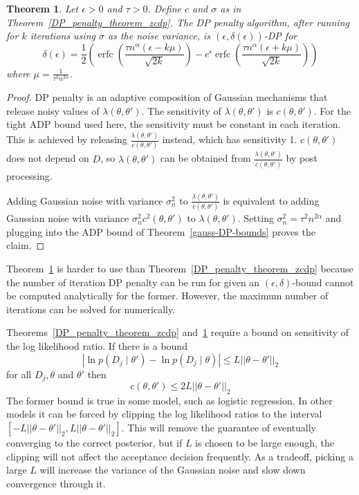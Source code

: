 \documentclass[english,twoside,openright]{HYgraduMLDS}
\newtheorem{theorem}{Theorem}
\DeclareMathOperator{\erfc}{erfc}
\begin{document}
\begin{theorem}\label{DP_penalty_theorem_adp}
    Let \(\epsilon > 0\) and \(\tau > 0\).
    Define \(c\) and \(\sigma\) as in Theorem~\ref{DP_penalty_theorem_zcdp}.
    The DP penalty algorithm, after running for \(k\) iterations using \(\sigma\)
    as the noise variance, 
    is \((\epsilon, \delta(\epsilon))\)-DP for
    \[
        \delta(\epsilon) 
        = \frac{1}{2}\left(
            \erfc\left(\frac{\tau n^\alpha(\epsilon - k\mu)}{\sqrt{2k}}\right)
            - e^\epsilon \erfc\left(\frac{\tau n^\alpha(\epsilon + k\mu)}{\sqrt{2k}}\right)
        \right)
    \]
    where \(\mu = \frac{1}{\tau^2 n^{2\alpha}}\).
\end{theorem}
\begin{proof}
    DP penalty is an adaptive composition of Gaussian mechanisms that release 
    noisy values of \(\lambda(\theta, \theta')\). The sensitivity of 
    \(\lambda(\theta, \theta')\) is 
    \(c(\theta, \theta')\). For the tight ADP bound used here, the sensitivity must be 
    constant in each iteration. This is achieved by releasing 
    \(\frac{\lambda(\theta, \theta')}{c(\theta, \theta')}\) instead, which 
    has sensitivity 1. \(c(\theta, \theta')\) does not depend on \(D\), 
    so \(\lambda(\theta, \theta')\) can be obtained from 
    \(\frac{\lambda(\theta, \theta')}{c(\theta, \theta')}\) by post processing.

    Adding Gaussian noise with variance \(\sigma_n^2\) to 
    \(\frac{\lambda(\theta, \theta')}{c(\theta, \theta')}\)
    is equivalent to adding Gaussian noise with variance 
    \(\sigma_n^2 c^2(\theta, \theta')\) to \(\lambda(\theta, \theta')\).
    Setting \(\sigma_n^2 = \tau^2n^{2\alpha}\) and plugging into 
    the ADP bound of Theorem~\ref{gauss-DP-bounds} proves the 
    claim.
\end{proof}

Theorem~\ref{DP_penalty_theorem_adp} is harder to use than 
Theorem~\ref{DP_penalty_theorem_zcdp} because the number of iteration 
DP penalty can be run for given an \((\epsilon, \delta)\)-bound cannot be 
computed analytically for the former. However, the maximum number of iterations 
can be solved for numerically.

Theorems~\ref{DP_penalty_theorem_zcdp} and~\ref{DP_penalty_theorem_adp}
require a bound on sensitivity of the log likelihood ratio. If there is a bound 
\[
    |\ln p(D_j\mid \theta') - \ln p(D_j\mid \theta)| \leq L||\theta - \theta'||_2
\]
for all \(D_j, \theta\) and \(\theta'\) then 
\[
    c(\theta, \theta') \leq 2L||\theta - \theta'||_2
\]
The former bound is true in some model, such as logistic regression. In other 
models it can be forced by clipping the log likelihood ratios to the interval 
\([-L||\theta - \theta'||_2, L||\theta - \theta'||_2]\). This will remove the 
guarantee of eventually converging to the correct posterior, but if \(L\) is 
chosen to be large enough, the clipping will not affect the 
acceptance decision frequently. As a tradeoff, picking a large \(L\) will increase 
the variance of the Gaussian noise and slow down convergence through it.
\end{document}
